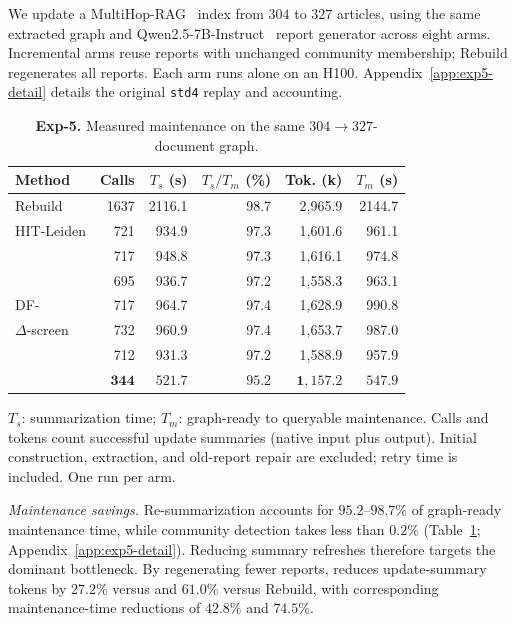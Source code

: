 We update a MultiHop-RAG~\cite{tang2024multihoprag} index from $304$ to $327$
articles, using the same extracted graph and
Qwen2.5-7B-Instruct~\cite{yang2024qwen25} report generator across eight arms.
Incremental arms reuse reports with unchanged community membership;
Rebuild regenerates all reports. Each arm runs alone on an H100.
Appendix~\ref{app:exp5-detail} details the original \texttt{std4} replay
and accounting.

\begin{table}[tb]\centering
\caption{\textbf{Exp-5.} Measured maintenance on the same $304\!\to\!327$-document graph.}
\label{tab:arena-main}
\footnotesize
\setlength{\tabcolsep}{0.25em}
\begin{tabular*}{\linewidth}{@{\extracolsep{\fill}}lrrrrr@{}}
\toprule
Method & Calls & $T_s$ (s) & $T_s/T_m$ (\%) & Tok. (k) & $T_m$ (s) \\
\midrule
Rebuild & 1637 & 2116.1 & 98.7 & 2,965.9 & 2144.7 \\
HIT-Leiden & 721 & 934.9 & 97.3 & 1,601.6 & 961.1 \\
\DynaMo{} & 717 & 948.8 & 97.3 & 1,616.1 & 974.8 \\
\QCA{} & 695 & 936.7 & 97.2 & 1,558.3 & 963.1 \\
DF-\Louvain{} & 717 & 964.7 & 97.4 & 1,628.9 & 990.8 \\
$\Delta$-screen & 732 & 960.9 & 97.4 & 1,653.7 & 987.0 \\
\Batch{} & 712 & 931.3 & 97.2 & 1,588.9 & 957.9 \\
\DyLo{} & $\mathbf{344}$ & $\mathbf{521.7}$ & $\mathbf{95.2}$ & $\mathbf{1,157.2}$ & $\mathbf{547.9}$ \\
\bottomrule
\end{tabular*}
\par\smallskip\raggedright
$T_s$: summarization time; $T_m$: graph-ready to queryable maintenance.
Calls and tokens count successful update summaries (native input plus output).
Initial construction, extraction, and old-report repair are excluded; retry
time is included. One run per arm.
\end{table}

\emph{Maintenance savings.} Re-summarization accounts for $95.2$--$98.7\%$
of graph-ready maintenance time, while community detection takes less than
$0.2\%$ (Table~\ref{tab:arena-main}; Appendix~\ref{app:exp5-detail}).
Reducing summary refreshes therefore targets the dominant bottleneck.
By regenerating fewer reports, \DyLo{} reduces update-summary tokens by
$27.2\%$ versus \Batch{} and $61.0\%$ versus Rebuild, with corresponding
maintenance-time reductions of $42.8\%$ and $74.5\%$.

